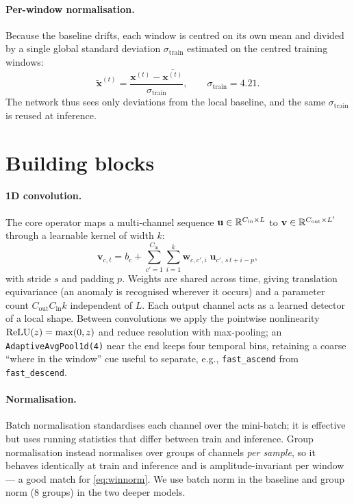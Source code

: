 \paragraph{Per-window normalisation.} Because the baseline drifts, each window is
centred on its own mean and divided by a single global standard deviation
$\sigma_{\mathrm{train}}$ estimated on the centred training windows:
\begin{equation}
    \tilde{\mathbf{x}}^{(t)}
    = \frac{\mathbf{x}^{(t)} - \overline{\mathbf{x}^{(t)}}}{\sigma_{\mathrm{train}}},
    \qquad \sigma_{\mathrm{train}} = 4.21 .
    \label{eq:winnorm}
\end{equation}
The network thus sees only deviations from the local baseline, and the same
$\sigma_{\mathrm{train}}$ is reused at inference.

\section{Building blocks}
\label{sec:blocks}

\paragraph{1D convolution.} The core operator maps a multi-channel sequence
$\mathbf{u}\in\mathbb{R}^{C_{\mathrm{in}}\times L}$ to
$\mathbf{v}\in\mathbb{R}^{C_{\mathrm{out}}\times L'}$ through a learnable kernel of width
$k$:
\begin{equation}
    \mathbf{v}_{c,t}
    = b_c + \sum_{c'=1}^{C_{\mathrm{in}}}\sum_{i=1}^{k}
        \mathbf{w}_{c,c',i}\;\mathbf{u}_{c',\,s\,t+i-p},
    \label{eq:conv}
\end{equation}
with stride $s$ and padding $p$. Weights are shared across time, giving
translation equivariance (an anomaly is recognised wherever it occurs) and a
parameter count $C_{\mathrm{out}}C_{\mathrm{in}}k$ independent of $L$. Each
output channel acts as a learned detector of a local shape. Between convolutions
we apply the pointwise nonlinearity $\operatorname{ReLU}(z)=\max(0,z)$ and reduce resolution
with max-pooling; an \texttt{AdaptiveAvgPool1d(4)} near the end keeps four
temporal bins, retaining a coarse ``where in the window'' cue useful to separate,
e.g., \texttt{fast\_ascend} from \texttt{fast\_descend}.

\paragraph{Normalisation.} Batch normalisation \cite{ioffe2015batch} standardises
each channel over the mini-batch; it is effective but uses running statistics
that differ between train and inference. Group normalisation \cite{wu2018group}
instead normalises over groups of channels \emph{per sample}, so it behaves
identically at train and inference and is amplitude-invariant per window --- a
good match for \cref{eq:winnorm}. We use batch norm in the baseline and group
norm (8 groups) in the two deeper models.

